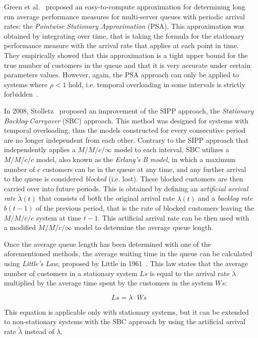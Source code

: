 Green et al.~\cite{green1991} proposed an easy-to-compute approximation for determining long run average performance measures for multi-server queues with periodic arrival rates: the \emph{Pointwise Stationary Approximation} (PSA). This approximation was obtained by integrating over time, that is taking the formula for the stationary performance measure with the arrival rate that applies at each point in time. They empirically showed that this approximation is a tight upper bound for the true number of customers in the queue and that it is very accurate under certain parameters values. However, again, the PSA approach can only be applied to systems where \( \rho < 1 \) hold, i.e. temporal overloading in some intervals is strictly forbidden~\cite{stolletz}.

In 2008, Stolletz~\cite{stolletz} proposed an improvement of the SIPP approach, the \emph{Stationary Backlog-Carryover} (SBC) approach. This method was designed for systems with temporal overloading, thus the models constructed for every consecutive period are no longer independent from each other. Contrary to the SIPP approach that independently applies a \( M/M/c/\infty \) model to each interval, SBC utilizes a \( M/M/c/c \) model, also known as the \emph{Erlang’s B model}, in which a maximum number of \( c \) customers can be in the queue at any time, and any further arrival to the queue is considered \emph{blocked} (i.e. lost). These blocked customers are then carried over into future periods. This is obtained by defining an \emph{artificial arrival rate} \( \widetilde{\lambda}(t) \) that consists of both the original arrival rate \( \lambda(t) \) and a \emph{backlog rate} \( b(t-1) \) of the previous period, that is the rate of blocked customers leaving the \( M/M/c/c \) system at time \( t-1 \). This artificial arrival rate can be then used with a modified \( M/M/c/\infty \) model to determine the average queue length.

Once the average queue length has been determined with one of the aforementioned methods, the average waiting time in the queue can be calculated using \emph{Little’s Law}, proposed by Little in 1961~\cite{little}. This law states that the average number of customers in a stationary system \( Ls \) is equal to the arrival rate \( \lambda \) multiplied by the average time spent by the customers in the system \( Ws \):

\begin{equation}
  Ls = \lambda \cdot Ws
  \label{eq:little_law}
\end{equation}

This equation is applicable only with stationary systems, but it can be extended to non-stationary systems with the SBC approach by using the artificial arrival rate \( \widetilde{\lambda} \) instead of \( \lambda \).

\clearpage
